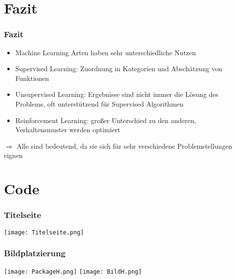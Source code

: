 \documentclass[11pt]{beamer}
\begin{document}
	\section{Fazit}
	
	\begin{frame}
		\frametitle{Fazit}
		\begin{itemize}
			\item Machine Learning Arten haben sehr unterschiedliche Nutzen
			\item Supervised Learning: Zuordnung in Kategorien und Abschätzung von Funktionen 
			\item Unsupervised Learning: Ergebnisse sind nicht immer die Lösung des Problems, oft unterstützend für Supervised Algorithmen
			\item Reinforcement Learning: großer Unterschied zu den anderen, Verhaltensmuster werden optimiert
		\end{itemize}
		$\Rightarrow$ Alle sind bedeutend, da sie sich für sehr verschiedene Problemstellungen eignen
		
	\end{frame}
	
	\section{Code}
	
	\begin{frame}
		\frametitle{Titelseite}
		\texttt{[image: Titelseite.png]}
	\end{frame}
	
	\begin{frame}
		\frametitle{Bildplatzierung}
		\texttt{[image: PackageH.png]}
		\texttt{[image: BildH.png]}
	\end{frame}
	
\end{document}
